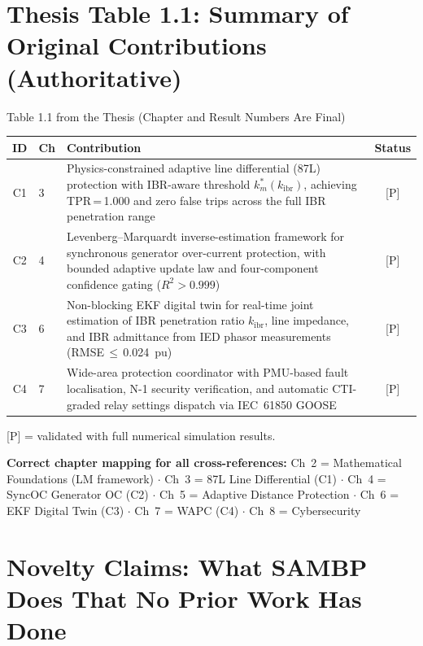 \documentclass[12pt,a4paper]{article}
\newcommand{\kibr}{k_\mathrm{ibr}}
\begin{document}
\section{Thesis Table 1.1: Summary of Original Contributions (Authoritative)}

\begin{resultbox}{Table 1.1 from the Thesis (Chapter and Result Numbers Are Final)}
\begin{center}
\small
\begin{tabular}{@{}clp{8.5cm}c@{}}
\toprule
\textbf{ID} & \textbf{Ch} & \textbf{Contribution} & \textbf{Status} \\
\midrule
C1 & 3
  & Physics-constrained adaptive line differential (87L) protection with
    IBR-aware threshold $k_m^*(\kibr)$, achieving TPR\,=\,1.000 and zero
    false trips across the full IBR penetration range
  & [P] \\[4pt]
C2 & 4
  & Levenberg--Marquardt inverse-estimation framework for synchronous
    generator over-current protection, with bounded adaptive update law
    and four-component confidence gating ($R^2 > 0.999$)
  & [P] \\[4pt]
C3 & 6
  & Non-blocking EKF digital twin for real-time joint estimation of IBR
    penetration ratio $\kibr$, line impedance, and IBR admittance from
    IED phasor measurements (RMSE\,$\leq$\,0.024~pu)
  & [P] \\[4pt]
C4 & 7
  & Wide-area protection coordinator with PMU-based fault localisation,
    N-1 security verification, and automatic CTI-graded relay settings
    dispatch via IEC~61850 GOOSE
  & [P] \\
\bottomrule
\end{tabular}
\end{center}
{\small [P] = validated with full numerical simulation results.}

\medskip
\textbf{Correct chapter mapping for all cross-references:}
Ch~2 = Mathematical Foundations (LM framework) $\cdot$
Ch~3 = 87L Line Differential (C1) $\cdot$
Ch~4 = SyncOC Generator OC (C2) $\cdot$
Ch~5 = Adaptive Distance Protection $\cdot$
Ch~6 = EKF Digital Twin (C3) $\cdot$
Ch~7 = WAPC (C4) $\cdot$
Ch~8 = Cybersecurity
\end{resultbox}

\section{Novelty Claims: What SAMBP Does That No Prior Work Has Done}
\end{document}

